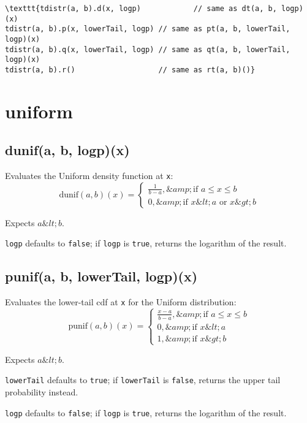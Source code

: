 \documentclass{article}
\begin{document}
\begin{lstlisting}
\texttt{tdistr(a, b).d(x, logp)            // same as dt(a, b, logp)(x)
tdistr(a, b).p(x, lowerTail, logp) // same as pt(a, b, lowerTail, logp)(x)
tdistr(a, b).q(x, lowerTail, logp) // same as qt(a, b, lowerTail, logp)(x)
tdistr(a, b).r()                   // same as rt(a, b)()}\end{lstlisting}

  \section{uniform}
    \subsection*{dunif(a, b, logp)(x)}
    Evaluates the Uniform density function at \texttt{x}:
$$\textrm{dunif}(a, b)(x) = \begin{cases}
  \frac{1}{b-a},  \&amp; \text{if $a \leq x \leq b$} \\
  0, \&amp; \text{if $x \&lt; a$ or $x \&gt; b$} \end{cases} $$


Expects $a \&lt; b$.


\texttt{logp} defaults to \texttt{false}; if \texttt{logp} is \texttt{true}, returns the
logarithm of the result.


    \subsection*{punif(a, b, lowerTail, logp)(x)}
    Evaluates the lower-tail cdf at \texttt{x} for the Uniform distribution:
$$\textrm{punif}(a, b)(x) = \begin{cases}
  \frac{x-a}{b-a},  \&amp; \text{if $a \leq x \leq b$} \\
  0,                \&amp; \text{if $x \&lt; a$} \\
  1,                \&amp; \text{if $x \&gt; b$} \end{cases} $$


Expects $a \&lt; b$.


\texttt{lowerTail} defaults to \texttt{true}; if \texttt{lowerTail} is \texttt{false}, returns
the upper tail probability instead.


\texttt{logp} defaults to \texttt{false}; if \texttt{logp} is \texttt{true}, returns the logarithm
of the result.
\end{document}
